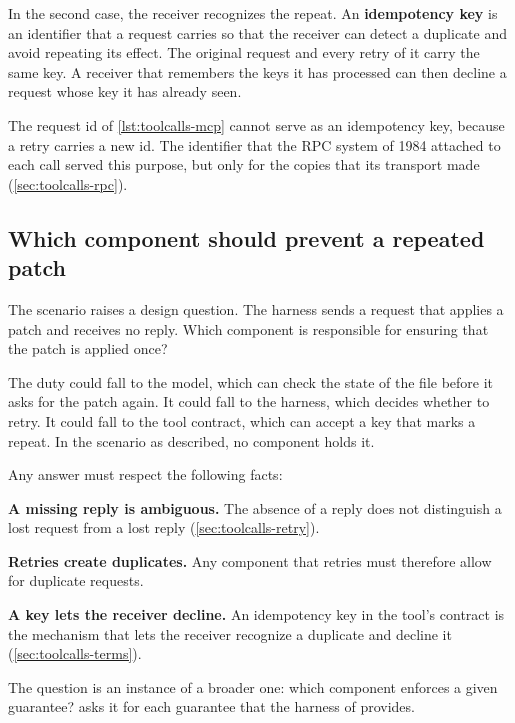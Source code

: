 In the second case, the receiver recognizes the repeat. An \textbf{idempotency key} is an identifier
that a request carries so that the receiver can detect a duplicate and avoid repeating its effect.
The original request and every retry of it carry the same key. A receiver that remembers the keys it
has processed can then decline a request whose key it has already seen.

The request id of \cref{lst:toolcalls-mcp} cannot serve as an idempotency key, because a retry
carries a new id. The identifier that the RPC system of 1984 attached to each call served this
purpose, but only for the copies that its transport made (\cref{sec:toolcalls-rpc}).

\subsection{Which component should prevent a repeated patch}
\label{sec:toolcalls-question}

The scenario raises a design question. The harness sends a request that applies a patch and
receives no reply. Which component is responsible for ensuring that the patch is applied once?

The duty could fall to the model, which can check the state of the file before it asks for the
patch again. It could fall to the harness, which decides whether to retry. It could fall to the tool
contract, which can accept a key that marks a repeat. In the scenario as described, no component
holds it.

Any answer must respect the following facts:
\bi
\item \textbf{A missing reply is ambiguous.} The absence of a reply does not distinguish a lost
request from a lost reply (\cref{sec:toolcalls-retry}).
\item \textbf{Retries create duplicates.} Any component that retries must therefore allow for
duplicate requests.
\item \textbf{A key lets the receiver decline.} An idempotency key in the tool's contract is the
mechanism that lets the receiver recognize a duplicate and decline it
(\cref{sec:toolcalls-terms}).
\ei

The question is an instance of a broader one: which component enforces a given guarantee?
 asks it for each guarantee that the harness of \msa{} provides.

